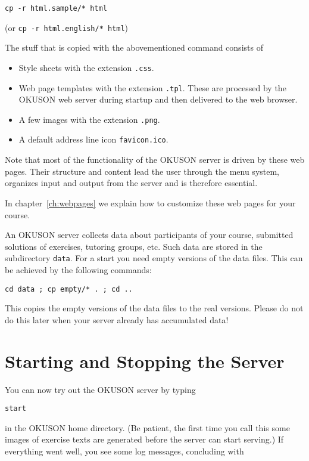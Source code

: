 \documentclass[12pt,openany,a4paper]{book}
\newcommand{\OKUSON}{\textsf{OKUSON}}
\begin{document}
\hspace*{1cm}\verb!cp -r html.sample/* html!

(or \verb!cp -r html.english/* html!)

The stuff that is copied with the abovementioned command consists of
\begin{itemize}
\item Style sheets with the extension \texttt{.css}.
\item Web page templates with the extension \texttt{.tpl}. These are
processed by the {\OKUSON} web server during startup and then delivered
to the web browser.
\item A few images with the extension \texttt{.png}.
\item A default address line icon \texttt{favicon.ico}.
\end{itemize}
Note that most  of the functionality of the {\OKUSON} server
is driven by these web pages. Their structure and content lead the user
through the menu system, organizes input and output from the server
and is therefore essential. 

In chapter~\ref{ch:webpages} we explain how to customize these web pages for
your course.

An {\OKUSON} server collects data about participants of your course,
submitted solutions of exercises, tutoring groups, etc. Such data are
stored in the subdirectory \texttt{data}. 
For a start you need empty versions of the data files. This can be achieved 
by the following commands:

\hspace*{1cm}\verb!cd data ; cp empty/* . ; cd ..!

This copies the empty versions of the data files to the
real versions. Please do not do this later when your server already
has accumulated data!

\section{Starting and Stopping the Server}

You can now try out the {\OKUSON} server by typing 

\hspace*{1cm}\texttt{start}

in the {\OKUSON} home directory. (Be patient, the first time you
call this some images of exercise texts are generated before the server can
start serving.) If everything went well, you
see some log messages, concluding with
\end{document}
